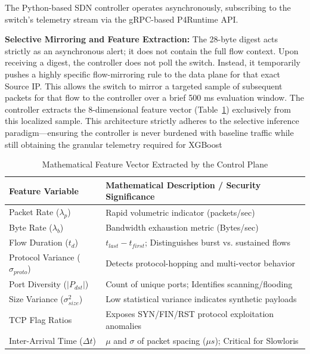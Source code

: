 \documentclass[sigconf, nonacm]{acmart}
\begin{document}
The Python-based SDN controller operates asynchronously, subscribing to the switch's telemetry stream via the gRPC-based P4Runtime API.

\textbf{Selective Mirroring and Feature Extraction:} The 28-byte digest acts strictly as an asynchronous alert; it does not contain the full flow context. Upon receiving a digest, the controller does not poll the switch. Instead, it temporarily pushes a highly specific flow-mirroring rule to the data plane for that exact Source IP. This allows the switch to mirror a targeted sample of subsequent packets for that flow to the controller over a brief 500 ms evaluation window. The controller extracts the 8-dimensional feature vector (Table~\ref{tab:features}) exclusively from this localized sample. This architecture strictly adheres to the selective inference paradigm—ensuring the controller is never burdened with baseline traffic while still obtaining the granular telemetry required for XGBoost

\begin{table}[htbp]
\centering
\caption{Mathematical Feature Vector Extracted by the Control Plane}
\label{tab:features}
\renewcommand{\arraystretch}{1.3}
\begin{tabularx}{\columnwidth}{|X|p{5.2cm}|}
\hline
\textbf{Feature Variable} & \textbf{Mathematical Description / Security Significance} \\
\hline
Packet Rate ($\lambda_p$) & Rapid volumetric indicator (packets/sec) \\ \hline
Byte Rate ($\lambda_b$) & Bandwidth exhaustion metric (Bytes/sec) \\ \hline
Flow Duration ($t_d$) & $t_{last} - t_{first}$; Distinguishes burst vs. sustained flows \\ \hline
Protocol Variance ($\sigma_{proto}$) & Detects protocol-hopping and multi-vector behavior \\ \hline
Port Diversity ($\vert P_{dst} \vert$) & Count of unique ports; Identifies scanning/flooding \\ \hline
Size Variance ($\sigma^2_{size}$) & Low statistical variance indicates synthetic payloads \\ \hline
TCP Flag Ratios & Exposes SYN/FIN/RST protocol exploitation anomalies \\ \hline
Inter-Arrival Time ($\Delta t$) & $\mu$ and $\sigma$ of packet spacing ($\mu s$); Critical for Slowloris \\ \hline
\end{tabularx}
\end{table}
\end{document}
